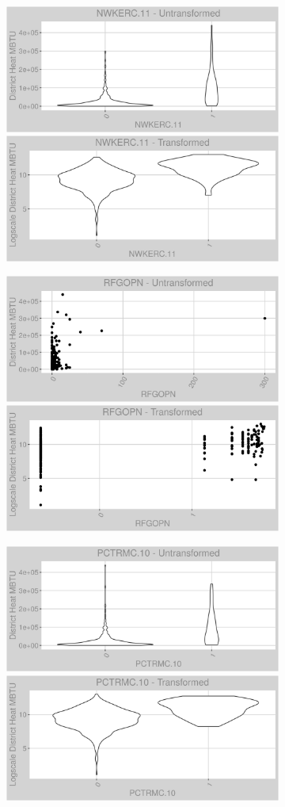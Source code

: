 \FloatBarrier
\newpage
\begin{figure}
\centering
\begin{subfigure}{1\textwidth}
\centering
\includegraphics[width=.49\textwidth, height=0.3\textheight]{Images/district_heat_var_original_18.png}
\includegraphics[width=.49\textwidth, height=0.3\textheight]{Images/district_heat_var_transformed_18.png}
\end{subfigure}
\begin{subfigure}{1\textwidth}
\centering
\includegraphics[width=.49\textwidth, height=0.3\textheight]{Images/district_heat_var_original_19.png}
\includegraphics[width=.49\textwidth, height=0.3\textheight]{Images/district_heat_var_transformed_19.png}
\end{subfigure}
\begin{subfigure}{1\textwidth}
\centering
\includegraphics[width=.49\textwidth, height=0.3\textheight]{Images/district_heat_var_original_20.png}
\includegraphics[width=.49\textwidth, height=0.3\textheight]{Images/district_heat_var_transformed_20.png}
\end{subfigure}
\end{figure}